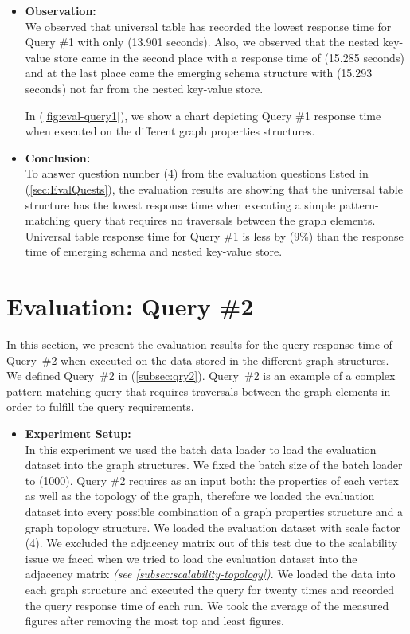 {\begin{itemize}
\item \textbf{Observation:}\\
We observed that universal table has recorded the lowest response time for Query \#1 with only (13.901 seconds). Also, we observed that the nested key-value store came in the second place with a response time of (15.285 seconds) and at the last place came the emerging schema structure with (15.293 seconds) not far from the nested key-value store.

In (\ref{fig:eval-query1}), we show a chart depicting Query \#1 response time when executed on the different graph properties structures.

\item \textbf{Conclusion:}\\
To answer question number (4) from the evaluation questions listed in (\ref{sec:EvalQuests}), the evaluation results are showing that the universal table structure has the lowest response time when executing a simple pattern-matching query that requires no traversals between the graph elements. Universal table response time for Query \#1 is less by (9\%) than the response time of emerging schema and nested key-value store.

\end{itemize}



\section{Evaluation: Query \#2}
\label{sec:eval-qry2}


In this section, we present the evaluation results for the query response time of \mbox{Query \#2} when executed on the data stored in the different graph structures. We defined \mbox{Query \#2} in (\ref{subsec:qry2}). \mbox{Query \#2} is an example of a complex pattern-matching query that requires traversals between the graph elements in order to fulfill the query requirements.


\begin{itemize}

\item \textbf{Experiment Setup:}\\
In this experiment we used the batch data loader to load the evaluation dataset into the graph structures. We fixed the batch size of the batch loader to (1000). Query \#2 requires as an input both: the properties of each vertex as well as the topology of the graph, therefore we loaded the evaluation dataset into every possible combination of a graph properties structure and a graph topology structure. We loaded the evaluation dataset with scale factor (4). We excluded the adjacency matrix out of this test due to the scalability issue we faced when we tried to load the evaluation dataset into the adjacency matrix \textit{(see \ref{subsec:scalability-topology})}. We loaded the data into each graph structure and executed the query for twenty times and recorded the query response time of each run. We took the average of the measured figures after removing the most top and least figures.



\end{itemize}}
